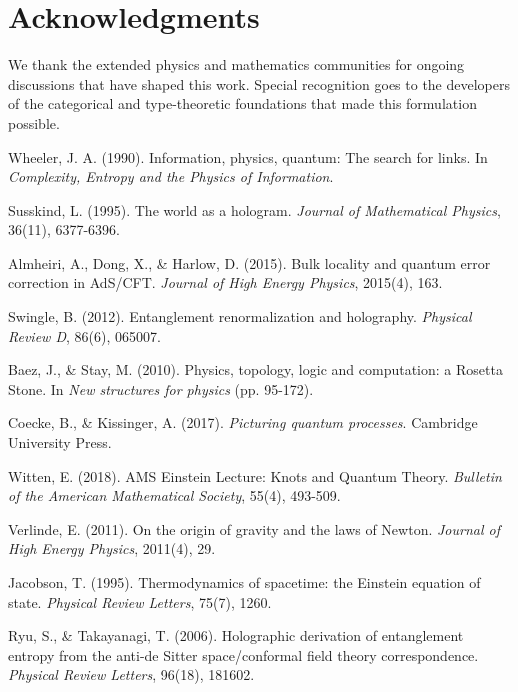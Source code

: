 \documentclass[12pt,a4paper]{article}
\begin{document}
\section{Acknowledgments}

We thank the extended physics and mathematics communities for ongoing discussions that have shaped this work. Special recognition goes to the developers of the categorical and type-theoretic foundations that made this formulation possible.

\begin{thebibliography}{99}

Wheeler, J. A. (1990). Information, physics, quantum: The search for links. In \emph{Complexity, Entropy and the Physics of Information}.

Susskind, L. (1995). The world as a hologram. \emph{Journal of Mathematical Physics}, 36(11), 6377-6396.

Almheiri, A., Dong, X., \& Harlow, D. (2015). Bulk locality and quantum error correction in AdS/CFT. \emph{Journal of High Energy Physics}, 2015(4), 163.

Swingle, B. (2012). Entanglement renormalization and holography. \emph{Physical Review D}, 86(6), 065007.

Baez, J., \& Stay, M. (2010). Physics, topology, logic and computation: a Rosetta Stone. In \emph{New structures for physics} (pp. 95-172).

Coecke, B., \& Kissinger, A. (2017). \emph{Picturing quantum processes}. Cambridge University Press.

Witten, E. (2018). AMS Einstein Lecture: Knots and Quantum Theory. \emph{Bulletin of the American Mathematical Society}, 55(4), 493-509.

Verlinde, E. (2011). On the origin of gravity and the laws of Newton. \emph{Journal of High Energy Physics}, 2011(4), 29.

Jacobson, T. (1995). Thermodynamics of spacetime: the Einstein equation of state. \emph{Physical Review Letters}, 75(7), 1260.

Ryu, S., \& Takayanagi, T. (2006). Holographic derivation of entanglement entropy from the anti-de Sitter space/conformal field theory correspondence. \emph{Physical Review Letters}, 96(18), 181602.


\end{thebibliography}
\end{document}

